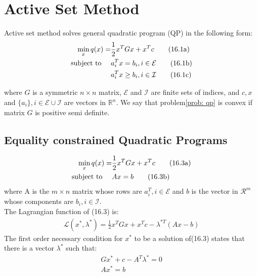 \documentclass[11pt]{article}
\begin{document}
    \section{Active Set Method} \label{sec:asm}
    Active set method solves general quadratic program (QP) in the following form:
    \begin{subequations}
        \label{prob: qp}
        \begin{align}
            \min_x q(x) = &\frac{1}{2} x^TGx + x^Tc \tag{16.1a}   \label{exp: qp_obj} \\
            \text{subject to \quad}  &a_i^Tx = b_i, i \in \mathcal{E} \tag{16.1b} \label{con: equality} \\
            &a_i^Tx \geq b_i, i \in \mathcal{I}  \tag{16.1c} \label{con: inequality}
        \end{align}
    \end{subequations}


    where $G$ is a symmetric $n\times n$ matrix, $\mathcal{E}$ and $\mathcal{I}$ are finite sets of indices, and $c, x$ and
    $\{a_i\}, i\in\mathcal{E}\cup\mathcal{I}$ are vectors in $\mathbb{R}^n$.
    We say that problem\eqref{prob: qp} is convex if matrix $G$ is positive semi definite.

    \subsection{Equality constrained Quadratic Programs} \label{subsec:-ec_qp}
    \begin{subequations}
        \label{prob: ec_qp}
        \begin{align}
            \min_x q(x) = &\frac{1}{2} x^TGx + x^Tc \tag{16.3a}   \label{exp: ec_qp_obj} \\
            \text{subject to \quad}  &Ax = b \tag{16.3b} \label{con: ec_qp}
        \end{align}
    \end{subequations}
    where A is the $m\times n$ matrix whose rows are $a_i^T, i\in\mathcal{E}$ and $b$ is the vector in $\mathcal{R}^m$
    whose components are $b_i, i\in\mathcal{I}$.\\
    The Lagrangian function of (16.3) is:
    \begin{align*}
        \mathcal{L}(x^*, \lambda^*) = \frac{1}{2} x^TGx + x^Tc - \lambda^{*T}(Ax - b)
    \end{align*}
    The first order necessary condition for $x^*$ to be a solution of(16.3) states that there is a vector $\lambda^*$
    such that:
    \begin{align*}
        Gx^* + c - A^T\lambda^* = 0\\
        Ax^* = b
    \end{align*}
\end{document}
